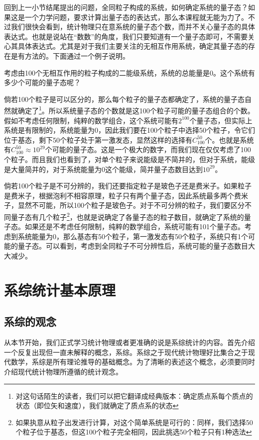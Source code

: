 \documentclass[../../main.tex]{subfiles}
\begin{document}
回到上一小节结尾提出的问题，全同粒子构成的系统，如何确定系统的量子态？如果这是一个力学问题，要求计算出量子态的表达式，那么本课程就无能为力了。不过我们很快会看到，统计物理只在意系统的量子态个数，而并不关心量子态的具体表达式。也就是说站在“数数”的角度，我们只要知道有一个量子态即可，不需要关心其具体表达式。尤其是对于我们主要关注的无相互作用系统，确定其量子态的存在是有方法的。下面通过一个例子说明。
\begin{example}
    考虑由100个无相互作用的粒子构成的二能级系统，系统的总能量是0。这个系统有多少个可能的量子态呢？
    \begin{solution}
        倘若100个粒子是可以区分的，那么每个粒子的量子态都确定了，系统的量子态自然就确定了\footnote{对这句话陌生的读者，我们可以把它翻译成经典版本：确定质点系每个质点的状态（即位矢和速度），我们就确定了质点系的状态}。所以系统量子态的个数就是这100个粒子可能的量子态组合的个数。假如不考虑任何限制，纯粹的数学组合，这个系统可能有\(2^{100}\)个量子态，但实际上系统是有限制的，系统能量为0，因此我们要在100个粒子中选择50个粒子，令它们位于基态，剩下50个粒子处于第一激发态，显然这样的选择有\(C_{100}^{50}\)个。也就是系统有\(C_{100}^{50}\approx10^{29}\)个可能的量子态。这是一个极大的数字，而我们现在仅仅考虑了100个粒子。而且我们也看到了，对单个粒子来说能级是不简并的，但对于系统，能级是大量简并的，对于系统能量为0这个能级，简并量子态数目达到\(10^{29}\)。

        倘若100个粒子是不可分辨的，我们还要指定粒子是玻色子还是费米子。如果粒子是费米子，根据泡利不相容原理，粒子只有两个量子态，因此系统最多两个费米子，显然不可能，所以100个粒子是玻色子。对于不可分辨的粒子，我们要区分不同量子态有几个粒子\footnote{如果执意从粒子出发进行计算，对这个简单系统是可行的：同样，我们选择50个粒子位于基态，但这100个粒子完全相同，因此挑选50个粒子只有1种选法}，也就是说确定了各量子态的粒子数目，就确定了系统的量子态。如果还是不考虑任何限制，纯粹的数学组合，系统可能有101个量子态。考虑到系统能量为0，那么基态有50个粒子，第一激发态有50个粒子，系统只有1个可能的量子态。可以看到，考虑到全同粒子不可分辨性后，系统可能的量子态数目大大减少。
    \end{solution}
\end{example}


\section{系综统计基本原理}
\subsection{系综的观念}
从本节开始，我们正式学习统计物理或者更准确的说是系综统计的内容。首先介绍一个反复出现但一直未解释的概念，系综。系综之于现代统计物理好比集合之于现代数学，系综是所有理论推导的基础概念。为了清晰的表述这个概念，必须要同时介绍现代统计物理所遵循的统计观念。
\end{document}
